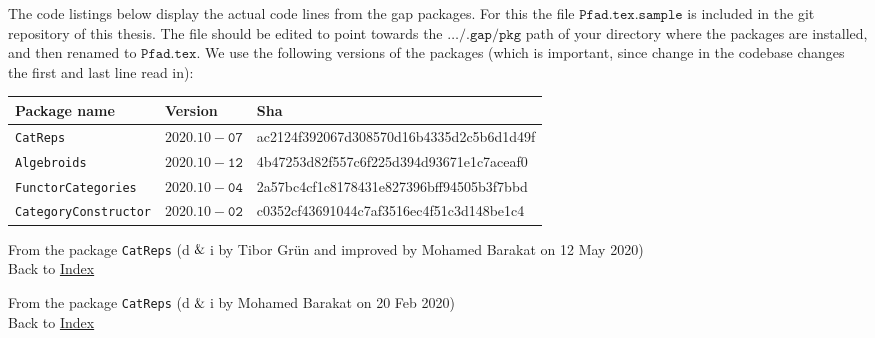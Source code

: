 
The code listings below display the actual code lines from the gap packages. For this the file $\mathtt{Pfad.tex.sample}$ is included in the
git repository of this thesis. The file should be edited to point towards
the $\mathtt{\dots/.gap/pkg}$ path of your \Gap{} directory where the packages are installed, and then renamed to $\mathtt{Pfad.tex}$.
We use the following versions of the \Gap{} packages (which is important, since change in the codebase changes the first and last line read in):\\

\begin{tabular}[h]{l|l|l}
Package name & Version & Sha \\
\hline
\texttt{CatReps} & $\mathtt{2020.10-07}$ & ac2124f392067d308570d16b4335d2c5b6d1d49f \\
\texttt{Algebroids} & $\mathtt{2020.10-12}$ & 4b47253d82f557c6f225d394d93671e1c7aceaf0 \\
\texttt{FunctorCategories} & $\mathtt{2020.10-04}$ & 2a57bc4cf1c8178431e827396bff94505b3f7bbd \\
\texttt{CategoryConstructor} & $\mathtt{2020.10-02}$ & c0352cf43691044c7af3516ec4f51c3d148be1c4 \\
\end{tabular} 

\lstlistoflistings\label{lol}

\renewcommand{\lstlistingname}{Procedure}



From the package \texttt{CatReps} (d$\And$i by Tibor Grün and improved by Mohamed Barakat on 12 May 2020) \\
Back to \hyperref[lol]{Index}


From the package \texttt{CatReps} (d$\And$i by Mohamed Barakat on 20 Feb 2020) \\
Back to \hyperref[lol]{Index}
		
